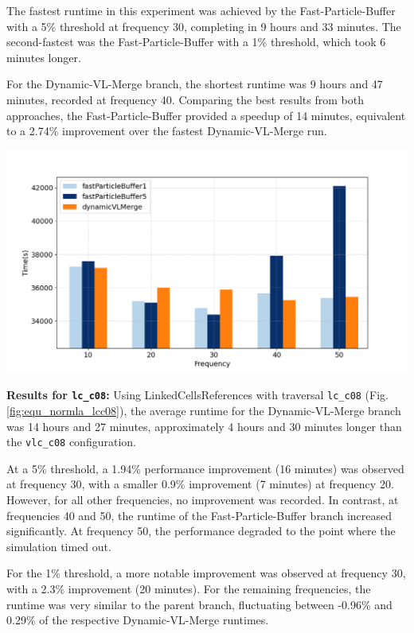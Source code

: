 The fastest runtime in this experiment was achieved by the Fast-Particle-Buffer with a 5\% threshold at frequency 30, completing in 9 hours and 33 minutes. The second-fastest was the Fast-Particle-Buffer with a 1\% threshold, which took 6 minutes longer.

For the Dynamic-VL-Merge branch, the shortest runtime was 9 hours and 47 minutes, recorded at frequency 40. Comparing the best results from both approaches, the Fast-Particle-Buffer provided a speedup of 14 minutes, equivalent to a 2.74\% improvement over the fastest Dynamic-VL-Merge run.

\begin{center}
    \includegraphics[width=0.8\linewidth]{graphs/spinodalDecomposition/vlcc08.png}
    \captionsetup{hypcap=false}
    \label{fig:equ_normla_vlcc08}
\end{center}



\textbf{Results for \texttt{lc\_c08}:}  
Using LinkedCellsReferences with traversal \texttt{lc\_c08} (Fig.\ref{fig:equ_normla_lcc08}), the average runtime for the Dynamic-VL-Merge branch was 14 hours and 27 minutes, approximately 4 hours and 30 minutes longer than the \texttt{vlc\_c08} configuration.

At a 5\% threshold, a 1.94\% performance improvement (16 minutes) was observed at frequency 30, with a smaller 0.9\% improvement (7 minutes) at frequency 20. However, for all other frequencies, no improvement was recorded. In contrast, at frequencies 40 and 50, the runtime of the Fast-Particle-Buffer branch increased significantly. At frequency 50, the performance degraded to the point where the simulation timed out.


For the 1\% threshold, a more notable improvement was observed at frequency 30, with a 2.3\% improvement (20 minutes). For the remaining frequencies, the runtime was very similar to the parent branch, fluctuating between -0.96\% and 0.29\% of the respective Dynamic-VL-Merge runtimes.

